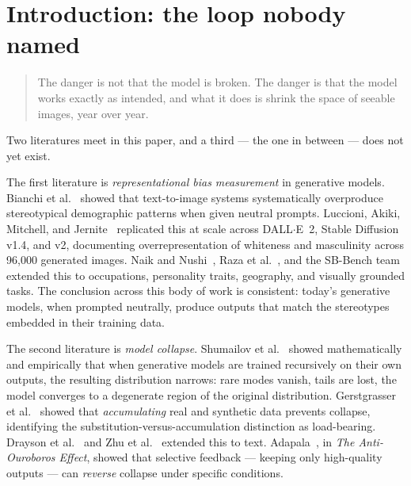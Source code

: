 \documentclass[sigconf,nonacm]{acmart}
\newenvironment{epigraphquote}{%
  \begin{quote}\itshape\small
}{%
  \end{quote}
}
\begin{document}
\section{Introduction: the loop nobody named}

\begin{epigraphquote}
The danger is not that the model is broken. The danger is that the model works exactly as intended, and what it does is shrink the space of seeable images, year over year.
\end{epigraphquote}

Two literatures meet in this paper, and a third --- the one in between --- does not yet exist.

The first literature is \emph{representational bias measurement} in generative models. Bianchi et al.~\cite{bianchi2023easily} showed that text-to-image systems systematically overproduce stereotypical demographic patterns when given neutral prompts. Luccioni, Akiki, Mitchell, and Jernite~\cite{luccioni2023stable} replicated this at scale across DALL$\cdot$E~2, Stable Diffusion v1.4, and v2, documenting overrepresentation of whiteness and masculinity across 96{,}000 generated images. Naik and Nushi~\cite{naik2023social}, Raza et al.~\cite{raza2025prompting}, and the SB-Bench team~\cite{sbbench2025} extended this to occupations, personality traits, geography, and visually grounded tasks. The conclusion across this body of work is consistent: today's generative models, when prompted neutrally, produce outputs that match the stereotypes embedded in their training data.

The second literature is \emph{model collapse}. Shumailov et al.~\cite{shumailov2024curse} showed mathematically and empirically that when generative models are trained recursively on their own outputs, the resulting distribution narrows: rare modes vanish, tails are lost, the model converges to a degenerate region of the original distribution. Gerstgrasser et al.~\cite{gerstgrasser2024inevitable} showed that \emph{accumulating} real and synthetic data prevents collapse, identifying the substitution-versus-accumulation distinction as load-bearing. Drayson et al.~\cite{drayson2025detection} and Zhu et al.~\cite{zhu2024synthesize} extended this to text. Adapala~\cite{adapala2025antiouroboros}, in \emph{The Anti-Ouroboros Effect}, showed that selective feedback --- keeping only high-quality outputs --- can \emph{reverse} collapse under specific conditions.
\end{document}
